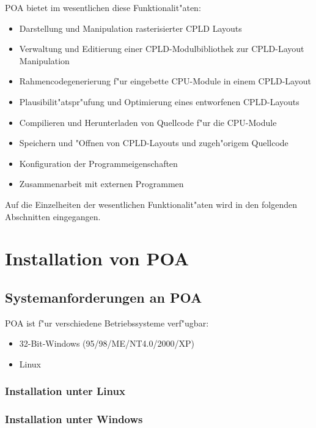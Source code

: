 \documentclass[a4paper,titlepage,12pt,ngerman]{scrbook}
\begin{document}
 POA bietet im wesentlichen diese Funktionalit"aten:
\begin{itemize}
\item Darstellung und Manipulation rasterisierter CPLD Layouts
\item Verwaltung und Editierung einer CPLD-Modulbibliothek zur CPLD-Layout
      Manipulation
\item Rahmencodegenerierung f"ur eingebette CPU-Module in einem CPLD-Layout
\item Plausibilit"atspr"ufung und Optimierung eines entworfenen CPLD-Layouts
\item Compilieren und Herunterladen von Quellcode f"ur die CPU-Module
\item Speichern und "Offnen von CPLD-Layouts und zugeh"origem Quellcode
\item Konfiguration der Programmeigenschaften
\item Zusammenarbeit mit externen Programmen
\end{itemize}
Auf die Einzelheiten der wesentlichen Funktionalit"aten wird in den folgenden Abschnitten eingegangen.



\chapter{Installation von POA}

\section{Systemanforderungen an POA}
POA ist f"ur verschiedene Betriebssysteme verf"ugbar:
\begin{itemize}
\item 32-Bit-Windows (95/98/ME/NT4.0/2000/XP)
\item Linux
\end{itemize}


\subsection{Installation unter Linux}
	
\subsection{Installation unter Windows}


	
\end{document}
